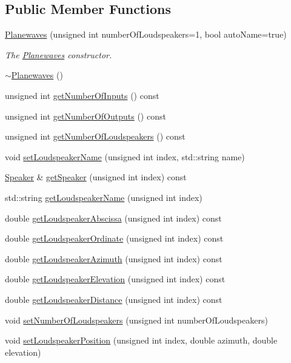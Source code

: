 \subsection*{Public Member Functions}
\begin{DoxyCompactItemize}
\item 
\hyperlink{class_hoa3_d_1_1_planewaves_a9168fb9b670cacf19c4eedff39e49f84}{Planewaves} (unsigned int number\-Of\-Loudspeakers=1, bool auto\-Name=true)
\begin{DoxyCompactList}\small\item\em The \hyperlink{class_hoa3_d_1_1_planewaves}{Planewaves} constructor. \end{DoxyCompactList}\item 
\hyperlink{class_hoa3_d_1_1_planewaves_a7d13cc39051ae75f2af522651a1305bf}{$\sim$\-Planewaves} ()
\item 
unsigned int \hyperlink{class_hoa3_d_1_1_planewaves_a7ecc6c4b38446a1cc6556a2790358453}{get\-Number\-Of\-Inputs} () const 
\item 
unsigned int \hyperlink{class_hoa3_d_1_1_planewaves_ad3585c6e0b727d350e5a4ff56c8d16c3}{get\-Number\-Of\-Outputs} () const 
\item 
unsigned int \hyperlink{class_hoa3_d_1_1_planewaves_a467cdb1f079bb299225a9fac56a500e4}{get\-Number\-Of\-Loudspeakers} () const 
\item 
void \hyperlink{class_hoa3_d_1_1_planewaves_a48700551e0f2a713a2503ea2c7a359b5}{set\-Loudspeaker\-Name} (unsigned int index, std\-::string name)
\item 
\hyperlink{class_hoa3_d_1_1_speaker}{Speaker} \& \hyperlink{class_hoa3_d_1_1_planewaves_acb9782d1e02534d0edcfd7f79ede6af2}{get\-Speaker} (unsigned int index) const 
\item 
std\-::string \hyperlink{class_hoa3_d_1_1_planewaves_ad23b6fd97d6d4d174e4f8ed713755e7e}{get\-Loudspeaker\-Name} (unsigned int index)
\item 
double \hyperlink{class_hoa3_d_1_1_planewaves_a729fa7173f28496f576e98affb5efb28}{get\-Loudspeaker\-Abscissa} (unsigned int index) const 
\item 
double \hyperlink{class_hoa3_d_1_1_planewaves_aa9cb3ab762f8fa753914c954eabb63b4}{get\-Loudspeaker\-Ordinate} (unsigned int index) const 
\item 
double \hyperlink{class_hoa3_d_1_1_planewaves_a811166a0c5a217c201a73dfd10fdfe4a}{get\-Loudspeaker\-Azimuth} (unsigned int index) const 
\item 
double \hyperlink{class_hoa3_d_1_1_planewaves_af4b7a2d06c7dab514c72ac64adab3a0f}{get\-Loudspeaker\-Elevation} (unsigned int index) const 
\item 
double \hyperlink{class_hoa3_d_1_1_planewaves_a87cd3fb6eda17c181aa9261f40276a08}{get\-Loudspeaker\-Distance} (unsigned int index) const 
\item 
void \hyperlink{class_hoa3_d_1_1_planewaves_a0e98bb0921bf5ba3130002f11548358f}{set\-Number\-Of\-Loudspeakers} (unsigned int number\-Of\-Loudspeakers)
\item 
void \hyperlink{class_hoa3_d_1_1_planewaves_afb91431ec200af76ac61ef17add33ede}{set\-Loudspeaker\-Position} (unsigned int index, double azimuth, double elevation)
\end{DoxyCompactItemize}


